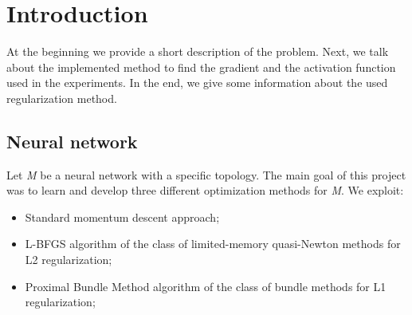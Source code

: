 \section{Introduction}
At the beginning we provide a short description of the problem. Next, we talk about the implemented method to find the gradient and the activation function used in the experiments. In the end, we give some information about the used regularization method.
\subsection{Neural network}
Let \textit{M} be a neural network with a specific topology. The main goal of this project was to learn and develop three different optimization methods for \textit{M}. We exploit:
\begin{itemize}
	\label{learningAlgorithm}
	\item Standard momentum descent approach;
	\item L-BFGS algorithm of the class of limited-memory quasi-Newton methods for L2 regularization;
	\item Proximal Bundle Method algorithm of the class of bundle methods for L1 regularization;
\end{itemize}
